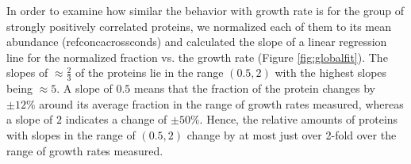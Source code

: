 In order to examine how similar the behavior with growth rate is for the group of strongly positively correlated proteins, we normalized each of them to its mean abundance (ref{concacrossconds}) and calculated the slope of a linear regression line for the normalized fraction vs. the growth rate (Figure \ref{fig:globalfit}).
The slopes of $\approx \frac{2}{3}$ of the proteins lie in the range $(0.5,2)$ with the highest slopes being $\approx 5$.
A slope of $0.5$ means that the fraction of the protein changes by $\pm12\%$ around its average fraction in the range of growth rates measured, whereas a slope of $2$ indicates a change of $\pm50\%$.
Hence, the relative amounts of proteins with slopes in the range of $(0.5,2)$ change by at most just over 2-fold over the range of growth rates measured.